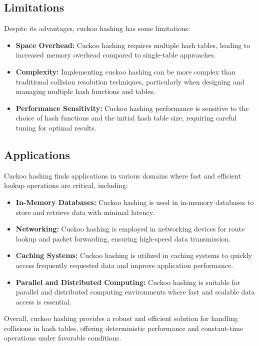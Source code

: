\documentclass[12pt]{article}
\begin{document}
\subsection{Limitations}

Despite its advantages, cuckoo hashing has some limitations:

\begin{itemize}
    \item \textbf{Space Overhead:} Cuckoo hashing requires multiple hash tables, leading to increased memory overhead compared to single-table approaches.
    \item \textbf{Complexity:} Implementing cuckoo hashing can be more complex than traditional collision resolution techniques, particularly when designing and managing multiple hash functions and tables.
    \item \textbf{Performance Sensitivity:} Cuckoo hashing performance is sensitive to the choice of hash functions and the initial hash table size, requiring careful tuning for optimal results.
\end{itemize}

\subsection{Applications}

Cuckoo hashing finds applications in various domains where fast and efficient lookup operations are critical, including:

\begin{itemize}
    \item \textbf{In-Memory Databases:} Cuckoo hashing is used in in-memory databases to store and retrieve data with minimal latency.
    \item \textbf{Networking:} Cuckoo hashing is employed in networking devices for route lookup and packet forwarding, ensuring high-speed data transmission.
    \item \textbf{Caching Systems:} Cuckoo hashing is utilized in caching systems to quickly access frequently requested data and improve application performance.
    \item \textbf{Parallel and Distributed Computing:} Cuckoo hashing is suitable for parallel and distributed computing environments where fast and scalable data access is essential.
\end{itemize}

Overall, cuckoo hashing provides a robust and efficient solution for handling collisions in hash tables, offering deterministic performance and constant-time operations under favorable conditions.
\end{document}
